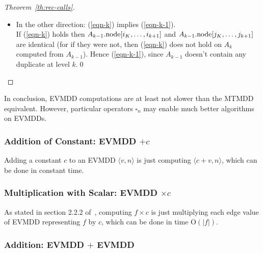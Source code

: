 \documentclass[a4paper,oneside,11pt,pdftex]{llncs}
\renewcommand{\O}[1]{\mathrm{O}\left(#1\right)}
\newcommand{\edge}[2]{\langle #1, #2 \rangle}
\newcommand{\node}[1]{#1{\rm .node}}
\begin{document}
\begin{proof}[Theorem~\ref{th:rec-calls}]
\begin{itemize}
\item In the other direction: (\ref{eqn-k}) implies (\ref{eqn-k-1}). \\
If (\ref{eqn-k}) holds then $\node{A_{k-1}}[i_K, \ldots, i_{k+1}]$ and
$\node{A_{k-1}}[j_K,\ldots, j_{k+1}]$ are identical (for if they were not, then (\ref{eqn-k})
does not hold on $A_k$ computed from $A_{k-1}$). Hence (\ref{eqn-k-1}), since
$A_{k-1}$ doesn't contain any duplicate at level $k$.\qed

\end{itemize}
\end{proof}

In conclusion, EVMDD computations are at least not slower than the MTMDD equivalent.
However, particular operators $\square_n$ may enable much better algorithms on EVMDDs.

\subsubsection{Addition of Constant: EVMDD $+ c$}

Adding a constant $c$ to an EVMDD $\edge{v}{n}$
is just computing $\edge{c+v}{n}$, which can be done
in constant time.

\subsubsection{Multiplication with Scalar: EVMDD $\times c$}

As stated in section 2.2.2 of~\cite{Lai1996}, computing
$f \times c$ is just multiplying each edge value
of EVMDD representing $f$ by $c$, which can be done in
time $\O{|f|}$.

\subsubsection{Addition: EVMDD $+$ EVMDD}
\end{document}
